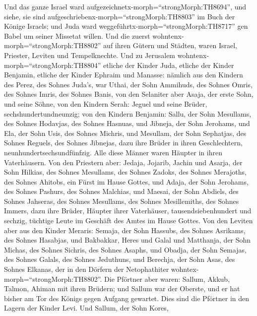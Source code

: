  Und das ganze Israel ward
aufgezeichnetx-morph=``strongMorph:TH8694'', und siehe, sie sind
aufgeschriebenx-morph=``strongMorph:TH8803'' im Buch der Könige Israels;
und Juda ward weggeführtx-morph=``strongMorph:TH8717'' gen Babel um
seiner Missetat willen.  Und die zuerst
wohntenx-morph=``strongMorph:TH8802'' auf ihren Gütern und Städten,
waren Israel, Priester, Leviten und Tempelknechte.  Und zu
Jerusalem wohntenx-morph=``strongMorph:TH8804'' etliche der Kinder Juda,
etliche der Kinder Benjamin, etliche der Kinder Ephraim und Manasse:
 nämlich aus den Kindern des Perez, des Sohnes Juda's, war
Uthai, der Sohn Ammihuds, des Sohnes Omris, des Sohnes Imris, des Sohnes
Banis,  von den Selaniter aber Asaja, der erste Sohn, und
seine Söhne,  von den Kindern Serah: Jeguel und seine
Brüder, sechshundertundneunzig;  von den Kindern Benjamin:
Sallu, der Sohn Mesullams, des Sohnes Hodavjas, des Sohnes Hasnuas,
 und Jibneja, der Sohn Jerohams, und Ela, der Sohn Usis, des
Sohnes Michris, und Mesullam, der Sohn Sephatjas, des Sohnes Reguels,
des Sohnes Jibnejas,  dazu ihre Brüder in ihren
Geschlechtern, neunhundertsechsundfünfzig. Alle diese Männer waren
Häupter in ihren Vaterhäusern.  Von den Priestern aber:
Jedaja, Jojarib, Jachin  und Asarja, der Sohn Hilkias, des
Sohnes Mesullams, des Sohnes Zadoks, des Sohnes Merajoths, des Sohnes
Ahitobs, ein Fürst im Hause Gottes,  und Adaja, der Sohn
Jerohams, des Sohnes Pashurs, des Sohnes Malchias, und Maesai, der Sohn
Abdiels, des Sohnes Jahseras, des Sohnes Mesullams, des Sohnes
Mesillemiths, des Sohnes Immers,  dazu ihre Brüder, Häupter
ihrer Vaterhäuser, tausendsiebenhundert und sechzig, tüchtige Leute im
Geschäft des Amtes im Hause Gottes.  Von den Leviten aber
aus den Kinder Meraris: Semaja, der Sohn Hassubs, des Sohnes Asrikams,
des Sohnes Hasabjas,  und Bakbakkar, Heres und Galal und
Matthanja, der Sohn Michas, des Sohnes Sichris, des Sohnes Asaphs,
 und Obadja, der Sohn Semajas, des Sohnes Galals, des
Sohnes Jeduthuns, und Berechja, der Sohn Asas, des Sohnes Elkanas, der
in den Dörfern der Netophathiter wohntex-morph=``strongMorph:TH8802''.
 Die Pförtner aber waren: Sallum, Akkub, Talmon, Ahiman mit
ihren Brüdern; und Sallum war der Oberste,  und er hat
bisher am Tor des Königs gegen Aufgang gewartet. Dies sind die Pförtner
in den Lagern der Kinder Levi.  Und Sallum, der Sohn Kores,
